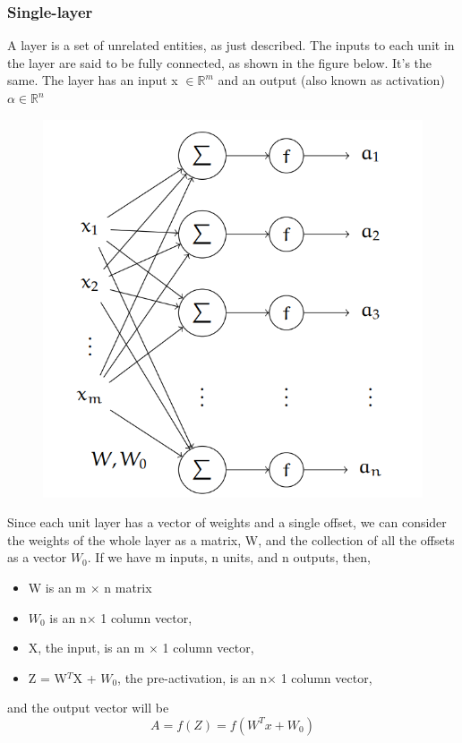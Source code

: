\subsubsection{Single-layer}
A layer is a set of unrelated entities, as  just described.  The  inputs to each unit in the layer are said to be fully connected, as shown in the figure below.  It's the same. The layer has an input x $\in\mathbb{R}^m$ and an output (also known as activation) $\alpha\in\mathbb{R}^n$
\begin{figure}[H]
    \centering
    \includegraphics[scale=0.3]{Figure/ml_2.png}
    \label{fig:my_label}
\end{figure}
Since each unit layer has a vector of weights and a single offset, we can consider the weights of
the whole layer as a matrix, W, and the collection of all the offsets as a vector $W_0$. If we
have m inputs, n units, and n outputs, then,
\begin{itemize}
    \item  W is an m $\times$ n matrix
     \item $W_0$ is an n$\times$  1 column vector,
     \item X, the input, is an m $\times$  1 column vector,
     \item Z = W$^T$X + $W_0$, the pre-activation, is an n$\times$  1 column vector,
\end{itemize}
and the output vector will be\\
\begin{equation*}
    A = f(Z) = f(W^Tx +W_0)
\end{equation*}

